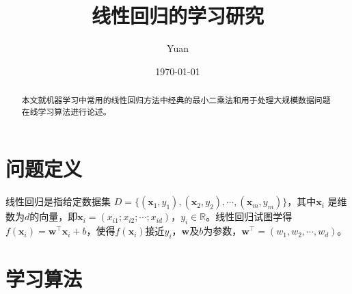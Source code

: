 \documentclass[12pt,a4paper,draft]{ctexart}
\title{线性回归的学习研究}
\author{Yuan}
\date{\small\today}
\begin{document}
\maketitle
\begin{abstract}
本文就机器学习中常用的线性回归方法中经典的最小二乘法和用于处理大规模数据问题在线学习算法进行论述。
\end{abstract}	
\section{问题定义}
线性回归是指给定数据集 $ D=\{(\bm{x}_{1},y_{1}),(\bm{x}_{2},y_{2}),\cdots,(\bm{x}_{m},y_{m})\} $，其中$\bm{x}_i$ 是维数为$ d $的向量，即$\bm{x}_i=(x_{i1};x_{i2};\cdots;x_{id})$，$y_{i}\in\mathbb{R} $。线性回归试图学得$f(\bm{x}_{i})=\bm{w}^\top\bm{x}_{i}+b$，使得$f(\bm{x}_{i})$接近$ y_{i}$，$\bm{w}$及$b$为参数，$\bm{w}^\top=(w_1,w_2,\cdots,w_d)$。
\section{学习算法}
\end{document}
